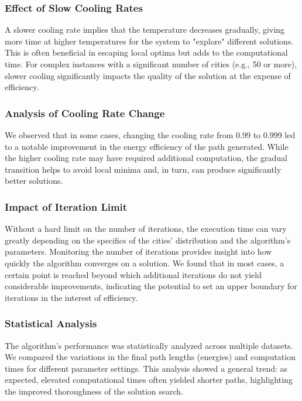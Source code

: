 \documentclass[a4paper,10pt]{article}
\begin{document}
\subsubsection{Effect of Slow Cooling Rates}
A slower cooling rate implies that the temperature decreases gradually, giving more time at higher temperatures for the system to "explore" different solutions. This is often beneficial in escaping local optima but adds to the computational time. For complex instances with a significant number of cities (e.g., 50 or more), slower cooling significantly impacts the quality of the solution at the expense of efficiency.

\subsubsection{Analysis of Cooling Rate Change}
We observed that in some cases, changing the cooling rate from 0.99 to 0.999 led to a notable improvement in the energy efficiency of the path generated. While the higher cooling rate may have required additional computation, the gradual transition helps to avoid local minima and, in turn, can produce significantly better solutions.

\subsubsection{Impact of Iteration Limit}
Without a hard limit on the number of iterations, the execution time can vary greatly depending on the specifics of the cities' distribution and the algorithm's parameters. Monitoring the number of iterations provides insight into how quickly the algorithm converges on a solution. We found that in most cases, a certain point is reached beyond which additional iterations do not yield considerable improvements, indicating the potential to set an upper boundary for iterations in the interest of efficiency.

\subsubsection{Statistical Analysis}
The algorithm’s performance was statistically analyzed across multiple datasets. We compared the variations in the final path lengths (energies) and computation times for different parameter settings. This analysis showed a general trend: as expected, elevated computational times often yielded shorter paths, highlighting the improved thoroughness of the solution search.
\end{document}
